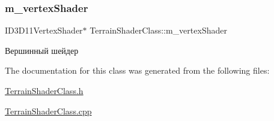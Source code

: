\subsubsection{\texorpdfstring{m\+\_\+vertex\+Shader}{m\_vertexShader}}
{\footnotesize\ttfamily I\+D3\+D11\+Vertex\+Shader$\ast$ Terrain\+Shader\+Class\+::m\+\_\+vertex\+Shader\hspace{0.3cm}{\ttfamily [private]}}



Вершинный шейдер 



The documentation for this class was generated from the following files\+:\begin{DoxyCompactItemize}
\item 
\hyperlink{_terrain_shader_class_8h}{Terrain\+Shader\+Class.\+h}\item 
\hyperlink{_terrain_shader_class_8cpp}{Terrain\+Shader\+Class.\+cpp}\end{DoxyCompactItemize}
